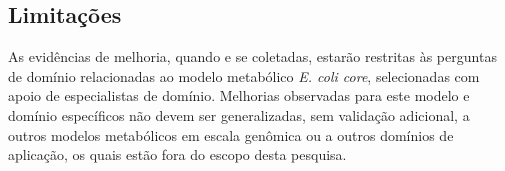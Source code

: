 \documentclass{article}
\begin{document}
\subsection{Limitações}

As evidências de melhoria, quando e se coletadas, estarão restritas às perguntas de domínio relacionadas ao modelo metabólico \textit{E. coli core}, selecionadas com apoio de especialistas de domínio. Melhorias observadas para este modelo e domínio específicos não devem ser generalizadas, sem validação adicional, a outros modelos metabólicos em escala genômica ou a outros domínios de aplicação, os quais estão fora do escopo desta pesquisa.




\end{document}
